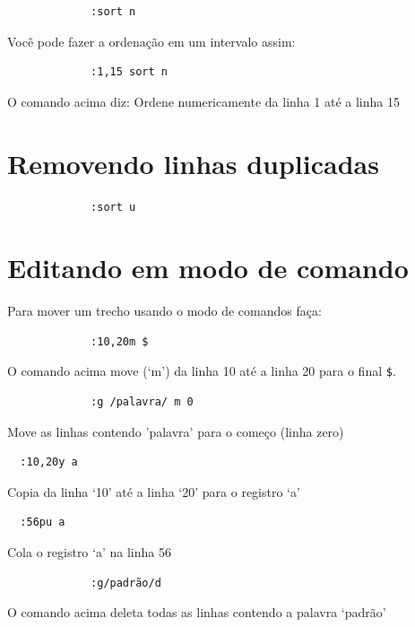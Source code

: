 \documentclass[10pt,a4paper,openany]{book}
\begin{document}
\begin{verbatim}
			 :sort n
\end{verbatim}

Você pode fazer a ordenação em um intervalo assim:

\begin{verbatim}
			 :1,15 sort n
\end{verbatim}

O comando acima diz: Ordene numericamente da linha 1 até a linha 15

\section{Removendo linhas duplicadas}

\begin{verbatim}
			 :sort u
\end{verbatim}


\section{Editando em modo de comando}\label{sec:Editando em modo de comando}

Para mover um trecho usando o modo de comandos faça:

\begin{verbatim}
			 :10,20m $
\end{verbatim}

O comando acima move (`m') da linha 10 até a linha 20 para o final \verb|$|.

\begin{verbatim}
			 :g /palavra/ m 0
\end{verbatim}

Move as linhas contendo 'palavra' para o começo (linha zero)


\begin{verbatim}
  :10,20y a
\end{verbatim}

Copia da linha `10' até a linha `20' para o registro `a'

\begin{verbatim}
  :56pu a
\end{verbatim}

Cola o registro `a' na linha 56

\begin{verbatim}
			 :g/padrão/d
\end{verbatim}

O comando acima deleta todas as linhas contendo a palavra `padrão'
\end{document}
